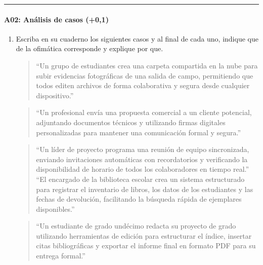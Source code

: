 \documentclass[letterpaper,10pt,spanish]{sphinxmanual}
\begin{document}
\bigskip\hrule\bigskip



\paragraph{A02: Análisis de casos (+0,1)}
\label{\detokenize{cursos/ofimatica10/periodo01/G01:a02-analisis-de-casos-0-1}}
\sphinxAtStartPar
{}
\begin{enumerate}
%
\item {} 
\sphinxAtStartPar
Escriba en su cuaderno los siguientes casos y al final de cada uno, indique que  de la ofimática corresponde y explique por que.
\begin{quote}

\sphinxAtStartPar
“Un grupo de estudiantes crea una carpeta compartida en la nube para subir evidencias fotográficas de una salida de campo, permitiendo que todos editen archivos de forma colaborativa y segura desde cualquier dispositivo.”
\end{quote}
\begin{quote}

\sphinxAtStartPar
“Un profesional envía una propuesta comercial a un cliente potencial, adjuntando documentos técnicos y utilizando firmas digitales personalizadas para mantener una comunicación formal y segura.”
\end{quote}
\begin{quote}

\sphinxAtStartPar
“Un líder de proyecto programa una reunión de equipo sincronizada, enviando invitaciones automáticas con recordatorios y verificando la disponibilidad de horario de todos los colaboradores en tiempo real.”
“El encargado de la biblioteca escolar crea un sistema estructurado para registrar el inventario de libros, los datos de los estudiantes y las fechas de devolución, facilitando la búsqueda rápida de ejemplares disponibles.”
\end{quote}
\begin{quote}

\sphinxAtStartPar
“Un estudiante de grado undécimo redacta su proyecto de grado utilizando herramientas de edición para estructurar el índice, insertar citas bibliográficas y exportar el informe final en formato PDF para su entrega formal.”
\end{quote}
\begin{quote}


\end{quote}
\end{enumerate}
\end{document}
